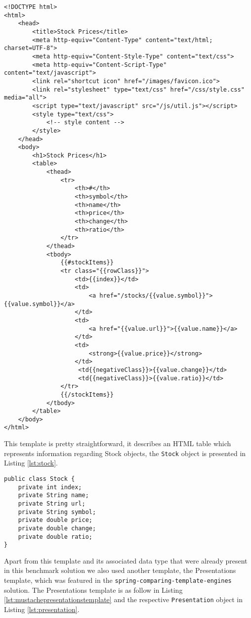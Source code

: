 \begin{lstlisting}[caption={Stocks Template - Mustache},captionpos=b,label={lst:mustachestockstemplate}]
<!DOCTYPE html>
<html>
	<head>
		<title>Stock Prices</title>
		<meta http-equiv="Content-Type" content="text/html; charset=UTF-8">
		<meta http-equiv="Content-Style-Type" content="text/css">
		<meta http-equiv="Content-Script-Type" content="text/javascript">
		<link rel="shortcut icon" href="/images/favicon.ico">
		<link rel="stylesheet" type="text/css" href="/css/style.css" media="all">
		<script type="text/javascript" src="/js/util.js"></script>
		<style type="text/css">
			<!-- style content -->
		</style>
	</head>
	<body>
		<h1>Stock Prices</h1>
		<table>
			<thead>
	    		<tr>
	     			<th>#</th>
	     			<th>symbol</th>
	     			<th>name</th>
	     			<th>price</th>
	     			<th>change</th>
	     			<th>ratio</th>
	    		</tr>
	   		</thead>
	   		<tbody>
				{{#stockItems}}
	    		<tr class="{{rowClass}}">
	     			<td>{{index}}</td>
	    			<td>
	      				<a href="/stocks/{{value.symbol}}">{{value.symbol}}</a>
	     			</td>
	     			<td>
	      				<a href="{{value.url}}">{{value.name}}</a>
	     			</td>
	     			<td>
	      				<strong>{{value.price}}</strong>
	     			</td>
				     <td{{negativeClass}}>{{value.change}}</td>
				     <td{{negativeClass}}>{{value.ratio}}</td>
	    		</tr>
				{{/stockItems}}
	   		</tbody>
		</table>
	</body>
</html>
\end{lstlisting}

\noindent
This template is pretty straightforward, it describes an \ac{HTML} table which represents information regarding Stock objects, the \texttt{Stock} object is presented in Listing \ref{lst:stock}.

\bigskip


\begin{minipage}{\linewidth}
\begin{lstlisting}[caption={Stocks Data Type},captionpos=b,label={lst:stock}]
public class Stock {
    private int index;
    private String name;
    private String url;
    private String symbol;
    private double price;
    private double change;
    private double ratio;    
}
\end{lstlisting}
\end{minipage}

\noindent
Apart from this template and its associated data type that were already present in this benchmark solution we also used another template, the Presentations template, which was featured in the \texttt{spring-comparing-template-engines} solution. The Presentations template is as follow in Listing \ref{lst:mustachepresentationstemplate} and the respective \texttt{Presentation} object in Listing \ref{lst:presentation}.

